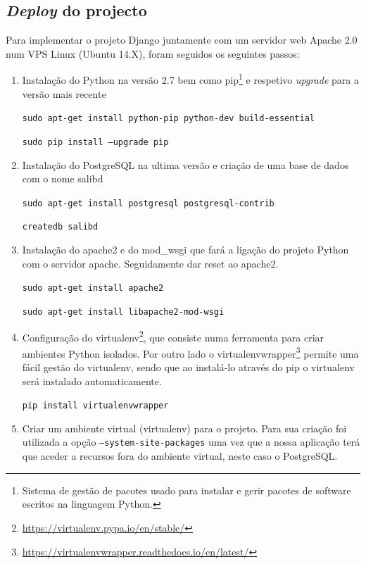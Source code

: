 \subsection{\textit{Deploy} do projecto}

Para implementar o projeto Django juntamente com um servidor web Apache 2.0 num \ac{VPS} Linux (Ubuntu 14.X), foram seguidos os seguintes passos: 






\begin{enumerate}
	\item Instalação do Python na versão 2.7 bem como pip\footnote{Sistema de gestão de pacotes usado para instalar e gerir pacotes de software escritos na linguagem Python.} e respetivo \textit{upgrade} para a versão mais recente
	
	\texttt{sudo apt-get install python-pip python-dev build-essential}
	
	\texttt{sudo pip install --upgrade pip}
	
	
	\item Instalação do PostgreSQL na ultima versão e criação de uma base de dados com o nome salibd
	
	
	\texttt{sudo apt-get install postgresql postgresql-contrib}

	\texttt{createdb salibd}	
	
	
	\item Instalação do apache2 e do mod\_wsgi que fará a ligação do projeto Python com o servidor apache. Seguidamente dar reset ao apache2.
	
	\texttt{sudo apt-get install apache2}
	
	\texttt{sudo apt-get install libapache2-mod-wsgi}
	
	
	\item Configuração do virtualenv\footnote{\url{https://virtualenv.pypa.io/en/stable/}}, que consiste numa ferramenta para criar ambientes Python isolados. Por outro lado o virtualenvwrapper\footnote{\url{https://virtualenvwrapper.readthedocs.io/en/latest/}} permite uma fácil gestão do virtualenv, sendo que ao instalá-lo através do pip o virtualenv será instalado automaticamente. 
	
	
	\texttt{pip install virtualenvwrapper}
	
	 
	\item Criar um ambiente virtual (virtualenv) para o projeto. Para sua criação foi utilizada a opção \texttt{--system-site-packages} uma vez que a nossa aplicação terá que aceder a recursos fora do ambiente virtual, neste caso o PostgreSQL. 
	

\end{enumerate}
